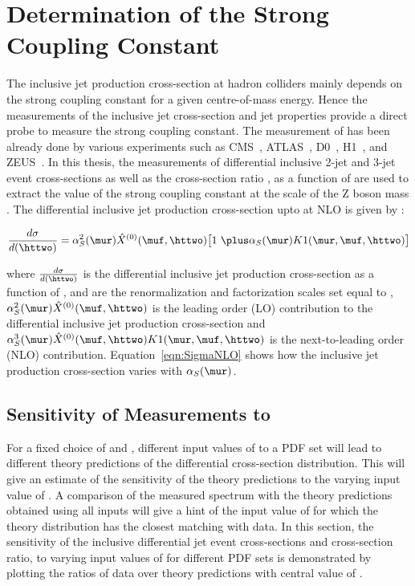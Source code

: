 \chapter{Determination of the Strong Coupling Constant}
\label{sec:Fits}
The inclusive jet production cross-section at hadron colliders mainly depends on the strong coupling constant \alps for a given centre-of-mass energy. Hence the measurements of the inclusive jet cross-section and jet properties provide a direct probe to measure the strong coupling constant. The measurement of \alps has been already done by various experiments such as CMS~\cite{Chatrchyan:2013txa, Chatrchyan:2013haa, Khachatryan:2014waa, CMS:2014mna, Khachatryan:2016mlc}, ATLAS~\cite{ATLAS:2015yaa}, D0~\cite{Abazov:2009nc, Abazov:2012lua}, H1~\cite{Andreev:2014wwa, Andreev:2016tgi}, and ZEUS~\cite{Abramowicz:2012jz}. In this thesis, the measurements of differential inclusive 2-jet and 3-jet event cross-sections as well as the cross-section ratio \ratio, as a function of \httwo are used to extract the value of the strong coupling constant at  the  scale  of  the  Z boson mass \alpsmz. The differential inclusive jet production cross-section upto at NLO is given by \cite{Affolder:2001hn} :

 \begin{equation}
 \frac{d\sigma}{d(\httwo)} = \alpha_S^2(\mur)\hat{X}^{(0)}(\muf,\httwo)\big[1~\plus \alpha_S(\mur)K1(\mur, \muf,\httwo)\big]
 \label{eqn:SigmaNLO}
 \end{equation}

 where $\frac{d\sigma}{d(\httwo)}$ is the differential inclusive jet production cross-section as a function of \httwo, \mur and \muf are the renormalization and factorization scales set equal to \httwo, $\alpha_S^2(\mur)\hat{X}^{(0)}(\muf,\httwo)$ is the leading order (LO) contribution to the differential inclusive jet production cross-section and $\alpha_S^3(\mur)\hat{X}^{(0)}(\muf,\httwo)K1(\mur, \muf,\httwo)$ is the next-to-leading order (NLO) contribution. Equation~\ref{eqn:SigmaNLO} shows how the inclusive jet production cross-section varies with $\alpha_S(\mur)$. 
 
\section{Sensitivity of Measurements to \texorpdfstring{\alpsmz}{alpha-S(M(Z))}}
\label{sec:sensitivity}
 
For a fixed choice of \mur and \muf, different input values of \alpsmz to a PDF set will lead to different theory predictions of the differential cross-section distribution. This will give an estimate of the sensitivity of the theory predictions to the varying input value of \alpsmz. A comparison of the measured spectrum with the theory predictions obtained using all \alpsmz inputs will give a hint of the input value of \alpsmz for which the theory distribution has the closest matching with data. In this section, the sensitivity of the inclusive differential jet event cross-sections and cross-section ratio, \ratio to varying input values of \alpsmz for different PDF sets is demonstrated by plotting the ratios of data over theory predictions with central value of \alpsmz.

